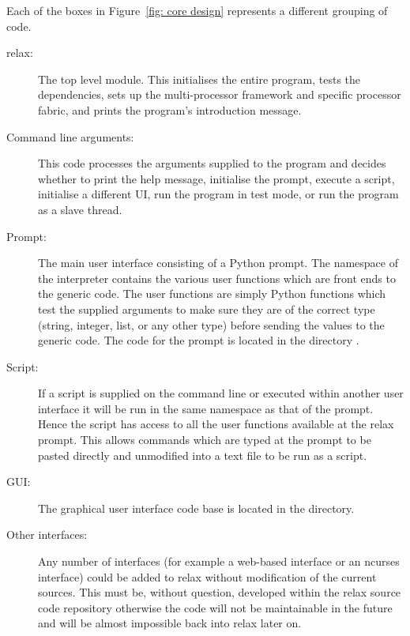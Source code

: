 Each of the boxes in Figure~\ref{fig: core design} represents a different grouping of code.
\begin{description}
\item[relax:]  The top level module.  This initialises the entire program, tests the dependencies, sets up the multi-processor framework and specific processor fabric, and prints the program's introduction message.

\item[Command line arguments:]  This code processes the arguments supplied to the program and decides whether to print the help message, initialise the prompt, execute a script, initialise a different UI, run the program in test mode, or run the program as a slave thread.

\item[Prompt:]  The main user interface consisting of a Python prompt.  The namespace of the interpreter contains the various user functions which are front ends to the generic code.  The user functions are simply Python functions which test the supplied arguments to make sure they are of the correct type (string, integer, list, or any other type) before sending the values to the generic code.  The code for the prompt is located in the directory .

\item[Script:]  If a script is supplied on the command line or executed within another user interface it will be run in the same namespace as that of the prompt.  Hence the script has access to all the user functions available at the relax prompt.  This allows commands which are typed at the prompt to be pasted directly and unmodified into a text file to be run as a script.

\item[GUI:]  The graphical user interface code base is located in the  directory.

\item[Other interfaces:]  Any number of interfaces (for example a web-based interface or an ncurses interface) could be added to relax without modification of the current sources.  This must be, without question, developed within the relax source code repository otherwise the code will not be maintainable in the future and will be almost impossible back into relax later on.


\end{description}
